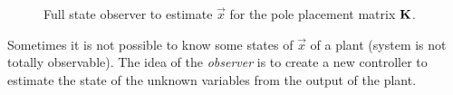 \begin{figure}
	\centering
	\resizebox{\linewidth}{!}{%
	}
	\caption{
		Full state observer to estimate \(\vec{x}\) for the pole placement matrix \(\bm{\mathrm{K}}\).
		\label{fig:ss-observer}
	}
\end{figure}

Sometimes it is not possible to know some states of \(\vec{x}\) of a plant (system is not totally observable). The idea of the \emph{observer} is to create a new controller to estimate the state of the unknown variables from the output of the plant. 
